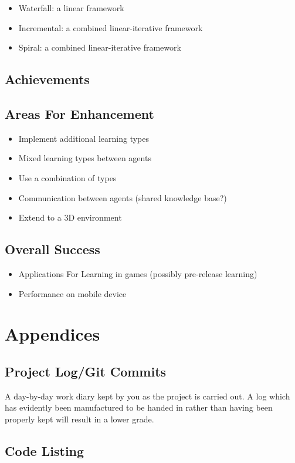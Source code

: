 \documentclass[runningheads,a4paper]{llncs}
\begin{document}
		\begin{itemize}
			\item Waterfall: a linear framework
			\item Incremental: a combined linear-iterative framework
			\item Spiral: a combined linear-iterative framework
		\end{itemize}
		
	\subsection{Achievements}
	\subsection{Areas For Enhancement}
		\begin{itemize}
			\item Implement additional learning types
			\item Mixed learning types between agents
			\item Use a combination of types
			\item Communication between agents (shared knowledge base?)
			\item Extend to a 3D environment
		\end{itemize}
	\subsection{Overall Success}
		\begin{itemize}
			\item Applications For Learning in games (possibly pre-release learning)
			\item Performance on mobile device
		\end{itemize}

\section{Appendices}

	\subsection{Project Log/Git Commits}
A day-by-day work diary kept by you as the project is carried out. A log which has evidently been manufactured to be handed in rather than having been properly kept will result in a lower grade.
	\subsection{Code Listing}

\newpage


\end{document}
